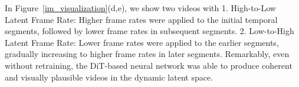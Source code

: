 In Figure~\ref{im_visualization}(d,e), we show two videos with 1. High-to-Low Latent Frame Rate: Higher frame rates were applied to the initial temporal segments, followed by lower frame rates in subsequent segments.
2. Low-to-High Latent Frame Rate: Lower frame rates were applied to the earlier segments, gradually increasing to higher frame rates in later segments. Remarkably, even without retraining, the DiT-based neural network was able to produce coherent and visually plausible videos in the dynamic latent space. 



